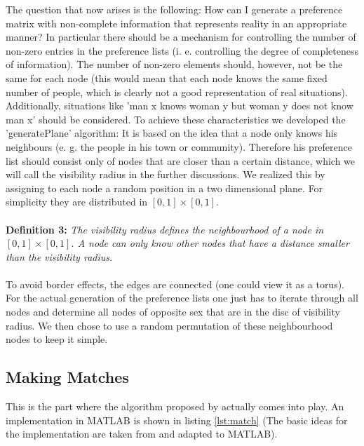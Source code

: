 \documentclass[11pt]{article}
\begin{document}
The question that now arises is the following: How can I generate a preference matrix
with non-complete information that represents reality in an appropriate manner? In 
particular there should be a mechanism for controlling the number of non-zero entries 
in the preference lists (i. e. controlling the degree of completeness of information). The 
number of non-zero elements should, however, not be the same for each node (this would 
mean that each node knows the same fixed number of people, which is clearly not a good 
representation of real situations). Additionally, situations like 'man x knows woman y but 
woman y does not know man x' should be considered.
To achieve these characteristics we developed the 'generatePlane' algorithm: It is based on 
the idea that a node only knows his neighbours (e. g. the people in his town or community). 
Therefore his preference list should consist only of nodes that are closer than a certain 
distance, which we will call the visibility radius in the further discussions. We realized this 
by assigning to each node a random position in a two dimensional plane. For simplicity they 
are distributed in $[0,1]\times[0,1]$. 
\\
\\
\textbf{Definition 3: }\textit{The visibility radius defines the neighbourhood of a node in $[0,1]\times[0,1]$. A node can only know other
nodes that have a distance smaller than the visibility radius.\label{eq:3}}
\\
\\
To avoid border effects, the edges are connected (one could 
view it as a torus). For the actual generation of the preference lists one just has to iterate 
through all nodes and determine all nodes of opposite sex that are in the disc of visibility 
radius. We then chose to use a random permutation of these neighbourhood nodes to keep it 
simple.

\subsection{Making Matches}

This is the part where the algorithm proposed by \citet{1962} actually comes into play. An implementation in MATLAB is shown in listing
\ref{lst:match} (The basic ideas for the implementation are taken from \citet{rosetta} and adapted to MATLAB).


\end{document}
